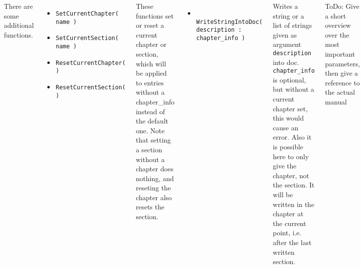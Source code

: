 \documentclass[margin=0cm,innermargin=0.7cm,blockverticalspace=0.5cm]{tikzposter}
\begin{document}
\begin{columns}
{
There are some additional functions.
\begin{itemize}
 \item \texttt{SetCurrentChapter( name ) }
 \item \texttt{SetCurrentSection( name ) }
 \item \texttt{ResetCurrentChapter( ) }
 \item \texttt{ResetCurrentSection( ) }
\end{itemize}
 These functions set or reset a current chapter or section, which will be applied to
 entries without a chapter\_info instead of the default one. Note that setting a section
 without a chapter does nothing, and reseting the chapter also resets the section.
\begin{itemize}
 \item \texttt{ WriteStringIntoDoc( description : chapter\_info ) }
\end{itemize}
Writes a string or a list of strings given as argument \texttt{description} into doc.
\texttt{chapter\_info} is optional, but without a current chapter set, this would cause an error.
Also it is possible here to only give the chapter, not the section. It will be written in the chapter at the current point,
i.e. after the last written section.
}


{

ToDo: Give a short overview over the most important parameters,
then give a reference to the actual manual

}


\end{columns}
\end{document}
